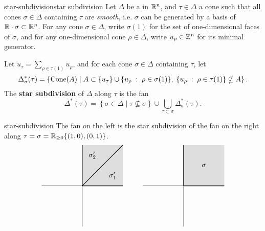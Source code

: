 \begin{topic}{star-subdivision}{star subdivision}
    Let $\Delta$ be a  in $\mathbb{R}^n$, and $\tau \in \Delta$ a cone such that all cones $\sigma \in \Delta$ containing $\tau$ are \textit{smooth}, i.e. $\sigma$ can be generated by a basis of $\mathbb{R} \cdot \sigma \subset \mathbb{R}^n$. For any cone $\sigma \in \Delta$, write $\sigma(1)$ for the set of one-dimensional faces of $\sigma$, and for any one-dimensional cone $\rho \in \Delta$, write $u_\rho \in \mathbb{Z}^n$ for its minimal generator.
    
    Let $u_\tau = \sum_{\rho \in \tau(1)} u_\rho$, and for each cone $\sigma \in \Delta$ containing $\tau$, let
    \[ \Delta^*_\sigma(\tau) = \left\{ \textup{Cone}(A) \;|\; A \subset \{ u_\tau \} \cup \{ u_\rho \;:\; \rho \in \sigma(1) \}, \; \{ u_\rho \;:\; \rho \in \tau(1) \} \nsubseteq A \right\} . \]
    The \textbf{star subdivision} of $\Delta$ along $\tau$ is the fan
    \[ \Delta^*(\tau) = \left\{ \sigma \in \Delta \;|\; \tau \nsubseteq \sigma \right\} \cup \bigcup_{\tau \subset \sigma} \Delta^*_\sigma(\tau) . \]
\end{topic}

\begin{example}{star-subdivision}
    The fan on the left is the star subdivision of the fan on the right along $\tau = \sigma = \mathbb{R}_{\ge 0} \{ (1, 0), (0, 1) \}$.
    \[ \begin{tikzpicture}
        \begin{scope}[shift={(-5,0)}]
            \draw (-2, 0) -- (2, 0);
            \draw (0, -2) -- (0, 2);
            \fill[fill=gray!50, opacity=0.5] (0, 0) -- (0, 2) -- (2, 2) -- (2, 0);
            \draw[thick] (0, 0) -- (2, 0);
            \draw[thick] (0, 0) -- (0, 2);
            \draw[thick] (0, 0) -- (2, 2);
            \node at (1.5, 0.5) {$\sigma'_1$};
            \node at (0.5, 1.5) {$\sigma'_2$};
        \end{scope}
        \begin{scope}
            \draw (-2, 0) -- (2, 0);
            \draw (0, -2) -- (0, 2);
            \fill[fill=gray!50, opacity=0.5] (0, 0) -- (0, 2) -- (2, 2) -- (2, 0);
            \draw[thick] (0, 0) -- (2, 0);
            \draw[thick] (0, 0) -- (0, 2);
            \node at (1, 1) {$\sigma$};
        \end{scope}
    \end{tikzpicture} \]
\end{example}

